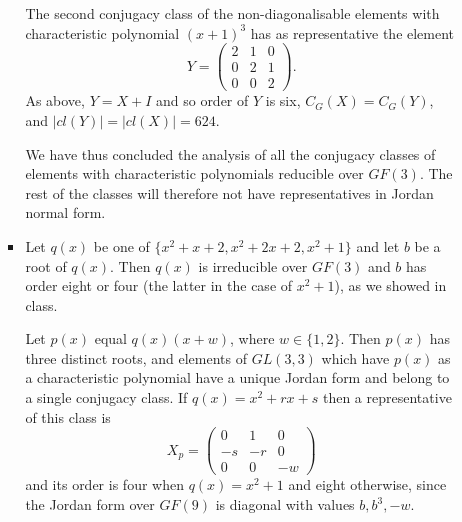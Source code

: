 \documentclass[11pt]{article} \usepackage{amssymb}
\begin{document}
\begin{enumerate}
\begin{enumerate}
\begin{itemize}
        The second conjugacy class of the non-diagonalisable elements with 
        characteristic polynomial
        $(x+1)^3$ has as representative the element
        \begin{equation*}
          Y=
          \begin{pmatrix}
            2&1  &0 \\ 
            0&2  &1 \\ 
            0&0  &2 
          \end{pmatrix}.
        \end{equation*}
        As above, $Y=X+I$ and so order of $Y$ is six,
        $C_G(X)=C_G(Y)$, and  $|cl(Y)|=|cl(X)|=624$.
        

        We have thus concluded the analysis of all the
        conjugacy classes of elements with characteristic polynomials 
        reducible over $GF(3)$. The rest of the classes will therefore not have
        representatives in Jordan normal form.

      \item
        Let $q(x)$ be one of $\{x^2+x+2,x^2+2x+2,x^2+1\}$ and let $b$ be a 
        root of
        $q(x)$. Then $q(x)$ is irreducible over $GF(3)$ and $b$ has order
        eight or four (the latter in the case of $x^2+1$), as we showed in 
        class. 

        Let $p(x)$ equal $q(x)(x+w)$, where $w\in\{1,2\}$. 
        Then $p(x)$ has three distinct roots, and elements of
        $GL(3,3)$ which have $p(x)$ as a characteristic polynomial have a
        unique Jordan form and belong to a single conjugacy class. 
        If $q(x)=x^2+rx+s$ then a
        representative of this class is
        \begin{equation*}
          X_p=\begin{pmatrix}
            0 & 1 & 0\\
            -s & -r & 0\\
            0 & 0 & -w
            \end{pmatrix}
        \end{equation*}
        and its order is four when $q(x)=x^2+1$ and eight otherwise, since
        the Jordan form over $GF(9)$ is diagonal with values $b,b^3,-w$.
        

\end{itemize}
\end{enumerate}
\end{enumerate}
\end{document}
